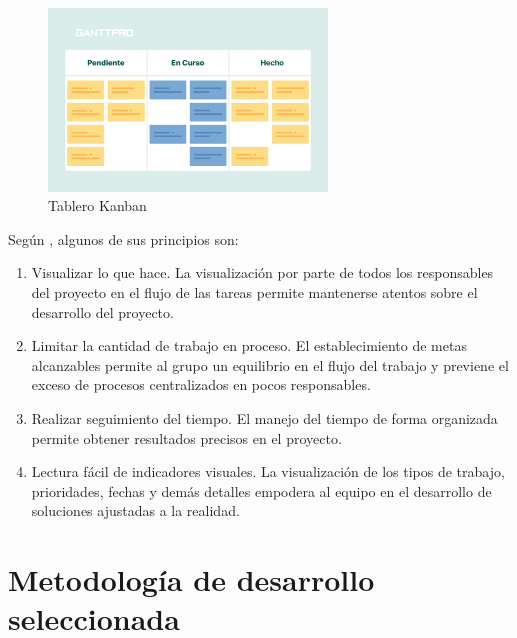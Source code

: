 \begin{itemize}
            \begin{figure}[h]
                \centering
                \includegraphics[width=0.66\textwidth]{figures/kanban.png}
                \caption[Tablero Kanban, extraído de \cite{stsepanets_metodo_2024}]{Tablero Kanban}
                \label{fig:metodologia:kanban}
            \end{figure}
            
    
            Según \cite{valtx_metodologias_2023}, algunos de sus principios son: 
    
            \begin{enumerate}
                \item Visualizar lo que hace. La visualización por parte de todos los responsables del proyecto en el flujo de las tareas permite mantenerse atentos sobre el desarrollo del proyecto.
                \item Limitar la cantidad de trabajo en proceso. El establecimiento de metas alcanzables permite al grupo un equilibrio en el flujo del trabajo y previene el exceso de procesos centralizados en pocos responsables.
                \item Realizar seguimiento del tiempo. El manejo del tiempo de forma organizada permite obtener resultados precisos en el proyecto.
                \item Lectura fácil de indicadores visuales. La visualización de los tipos de trabajo, prioridades, fechas y demás detalles empodera al equipo en el desarrollo de soluciones ajustadas a la realidad.
            \end{enumerate}
            
        \end{itemize}

\section{Metodología de desarrollo seleccionada}

